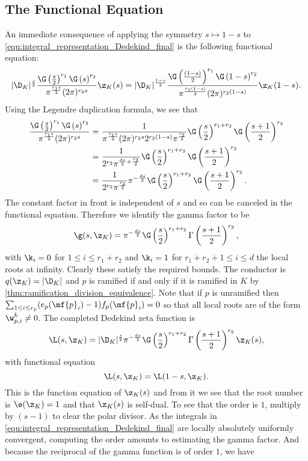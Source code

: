     \subsection*{The Functional Equation}
      An immediate consequence of applying the symmetry $s \mapsto 1-s$ to \cref{equ:integral_representation_Dedekind_final} is the following functional equation:
      \[
        |\D_{K}|^{\frac{s}{2}}\frac{\G\left(\frac{s}{2}\right)^{r_{1}}\G\left(s\right)^{r_{2}}}{\pi^{\frac{r_{1}s}{2}}(2\pi)^{r_{2}s}}\z_{K}(s) = |\D_{K}|^{\frac{1-s}{2}}\frac{\G\left(\frac{(1-s)}{2}\right)^{r_{1}}\G\left(1-s\right)^{r_{2}}}{\pi^{\frac{r_{1}(1-s)}{2}}(2\pi)^{r_{2}(1-s)}}\z_{K}(1-s).
      \]
      Using the Legendre duplication formula, we see that
      \begin{align*}
        \frac{\G\left(\frac{s}{2}\right)^{r_{1}}\G\left(s\right)^{r_{2}}}{\pi^{\frac{r_{1}s}{2}}(2\pi)^{r_{2}s}} &= \frac{1}{\pi^{\frac{r_{1}s}{2}}(2\pi)^{r_{2}s}2^{r_{2}(1-s)}\pi^{\frac{r_{2}}{2}}}\G\left(\frac{s}{2}\right)^{r_{1}+r_{2}}\G\left(\frac{s+1}{2}\right)^{r_{2}} \\
        &= \frac{1}{2^{r_{2}}\pi^{\frac{ds}{2}+\frac{r_{2}}{2}}}\G\left(\frac{s}{2}\right)^{r_{1}+r_{2}}\G\left(\frac{s+1}{2}\right)^{r_{2}} \\
        &= \frac{1}{2^{r_{2}}\pi^{\frac{r_{2}}{2}}}\pi^{-\frac{ds}{2}}\G\left(\frac{s}{2}\right)^{r_{1}+r_{2}}\G\left(\frac{s+1}{2}\right)^{r_{2}}.
      \end{align*}
      The constant factor in front is independent of $s$ and so can be canceled in the functional equation. Therefore we identify the gamma factor to be
      \[
        \g(s,\z_{K}) = \pi^{-\frac{ds}{2}}\G\left(\frac{s}{2}\right)^{r_{1}+r_{2}}\Gamma\left(\frac{s+1}{2}\right)^{r_{2}},
      \]
      with $\k_{i} = 0$ for $1 \le i \le r_{1}+r_{2}$ and $\k_{i} = 1$ for $r_{1}+r_{2}+1 \le i \le d$ the local roots at infinity. Clearly these satisfy the required bounds. The conductor is $q(\z_{K}) = |\D_{K}|$ and $p$ is ramified if and only if it is ramified in $K$ by \cref{thm:ramification_division_equivalence}. Note that if $p$ is unramified then $\sum_{1 \le i \le r_{p}}(e_{p}(\mf{p}_{i})-1)f_{p}(\mf{p}_{i}) = 0$ so that all local roots are of the form $\w_{p,i}^{k} \neq 0$. The completed Dedekind zeta function is
      \[
        \L(s,\z_{K}) = |\D_{K}|^{\frac{s}{2}}\pi^{-\frac{ds}{2}}\G\left(\frac{s}{2}\right)^{r_{1}+r_{2}}\Gamma\left(\frac{s+1}{2}\right)^{r_{2}}\z_{K}(s),
      \]
      with functional equation
      \[
        \L(s,\z_{K}) = \L(1-s,\z_{K}).
      \]
      This is the function equation of $\z_{K}(s)$ and from it we see that the root number is $\e(\z_{K}) = 1$ and that $\z_{K}(s)$ is self-dual. To see that the order is $1$, multiply by $(s-1)$ to clear the polar divisor. As the integrals in \cref{equ:integral_representation_Dedekind_final} are locally absolutely uniformly convergent, computing the order amounts to estimating the gamma factor. And because the reciprocal of the gamma function is of order $1$, we have
